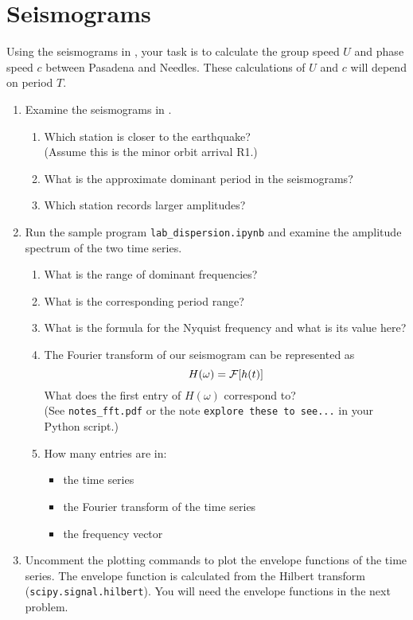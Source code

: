\documentclass[11pt,titlepage,fleqn]{article}
\newcommand{\fft}{h}
\newcommand{\ffw}{H}
\begin{document}

\section{Seismograms}

Using the seismograms in , your task is to calculate the group speed $U$ and phase speed $c$ between Pasadena and Needles. These calculations of $U$ and $c$ will depend on period $T$.

\begin{enumerate}
\item Examine the seismograms in .
%
\begin{enumerate}
\item Which station is closer to the earthquake? \\
(Assume this is the minor orbit arrival R1.)
\item What is the approximate dominant period in the seismograms?
\item Which station records larger amplitudes?
\end{enumerate}

\item Run the sample program \verb+lab_dispersion.ipynb+ and examine the amplitude spectrum of the two time series. 
%
\begin{enumerate}
\item What is the range of dominant frequencies?
\item What is the corresponding period range?
\item What is the formula for the Nyquist frequency and what is its value here?
\item The Fourier transform of our seismogram can be represented as
%
\begin{equation*}
\ffw(\omega) = \cF[\fft(t)]
\end{equation*}
%
What does the first entry of $\ffw(\omega)$ correspond to? \\
(See \verb+notes_fft.pdf+ or the note \verb+explore these to see...+ in your Python script.)
\item How many entries are in:
\begin{itemize}
\item the time series
\item the Fourier transform of the time series
\item the frequency vector
\end{itemize}
\end{enumerate}

\item Uncomment the plotting commands to plot the envelope functions of the time series. The envelope function is calculated from the Hilbert transform (\verb+scipy.signal.hilbert+). You will need the envelope functions in the next problem.

\end{enumerate}
\end{document}
